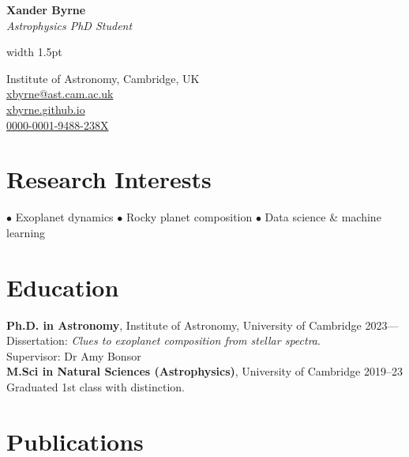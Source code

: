 \documentclass[a4paper,10pt]{article}
\makeatletter
\def\name{Xander Byrne}
\def\position{Astrophysics PhD Student}
\def\email{
  \href{mailto:xbyrne@ast.cam.ac.uk}{xbyrne@ast.cam.ac.uk}
}
\def\website{
  \href{https://xbyrne.github.io}{xbyrne.github.io}
}
\def\address{
  Institute of Astronomy,
  Cambridge, UK
}
\def\orcid{
  \href{https://orcid.org/0000-0001-9488-238X}{0000-0001-9488-238X}
}
\makeatother
\begin{document}
\noindent
\begin{minipage}[t]{0.73\textwidth}
  \vspace{1.2ex} %
  {\fontsize{50}{55}\selectfont \textbf{\name}}\\[0.3em]
  {\fontsize{20.5}{30}\textit{\position}}
\end{minipage}
{\color{highlight}\vrule width 1.5pt}
\begin{minipage}[t]{0.27\textwidth}
  \raggedleft
  {\fontsize{11}{12}\selectfont
    \vspace{.3em}
    \address \faMapMarker* \\[.3em]
    \email \faEnvelope[regular] \\[.1em]
    \website \faGithub \\[.3em]
    \orcid \faOrcid
  }
\end{minipage}

\section*{Research Interests}
{
  \large
  $\bullet$ Exoplanet dynamics
  \hspace{1.5em}
  $\bullet$ Rocky planet composition
  \hspace{1.5em}
  $\bullet$ Data science \& machine learning
}

\section*{Education}

\textbf{Ph.D. in Astronomy}, Institute of Astronomy, University of Cambridge \hfill 2023---\\
Dissertation: \textit{Clues to exoplanet composition from stellar spectra}.\\
Supervisor: Dr Amy Bonsor\\

\noindent \textbf{M.Sci in Natural Sciences (Astrophysics)}, University of Cambridge \hfill 2019--23 \\
Graduated 1st class with distinction.

\section*{Publications}
\end{document}
